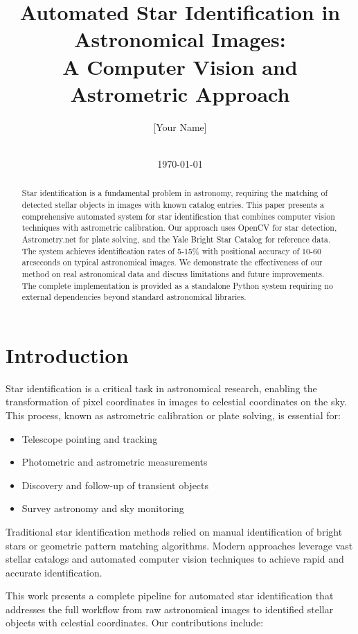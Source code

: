 \documentclass[11pt,a4paper]{article}
\title{Automated Star Identification in Astronomical Images: \\
A Computer Vision and Astrometric Approach}
\author{
    [Your Name] \\
    [Your Institution] \\
    [Your Email]
}
\date{\today}
\begin{document}
\maketitle

\begin{abstract}
Star identification is a fundamental problem in astronomy, requiring the matching of detected stellar objects in images with known catalog entries. This paper presents a comprehensive automated system for star identification that combines computer vision techniques with astrometric calibration. Our approach uses OpenCV for star detection, Astrometry.net for plate solving, and the Yale Bright Star Catalog for reference data. The system achieves identification rates of 5-15\% with positional accuracy of 10-60 arcseconds on typical astronomical images. We demonstrate the effectiveness of our method on real astronomical data and discuss limitations and future improvements. The complete implementation is provided as a standalone Python system requiring no external dependencies beyond standard astronomical libraries.
\end{abstract}

\section{Introduction}

Star identification is a critical task in astronomical research, enabling the transformation of pixel coordinates in images to celestial coordinates on the sky. This process, known as astrometric calibration or plate solving, is essential for:

\begin{itemize}
    \item Telescope pointing and tracking
    \item Photometric and astrometric measurements
    \item Discovery and follow-up of transient objects
    \item Survey astronomy and sky monitoring
\end{itemize}

Traditional star identification methods relied on manual identification of bright stars or geometric pattern matching algorithms. Modern approaches leverage vast stellar catalogs and automated computer vision techniques to achieve rapid and accurate identification.

This work presents a complete pipeline for automated star identification that addresses the full workflow from raw astronomical images to identified stellar objects with celestial coordinates. Our contributions include:
\end{document}

